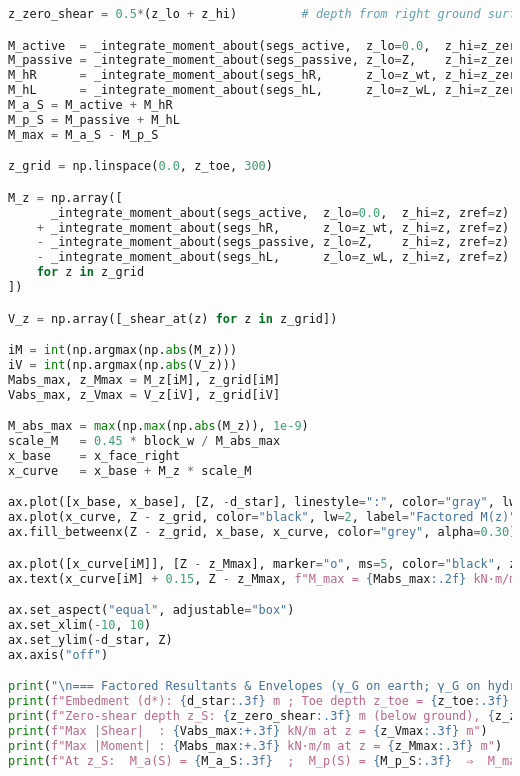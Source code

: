 \begin{lstlisting}[language=Python]
z_zero_shear = 0.5*(z_lo + z_hi)         # depth from right ground surface

M_active  = _integrate_moment_about(segs_active,  z_lo=0.0,  z_hi=z_zero_shear, zref=z_zero_shear)
M_passive = _integrate_moment_about(segs_passive, z_lo=Z,    z_hi=z_zero_shear, zref=z_zero_shear)
M_hR      = _integrate_moment_about(segs_hR,      z_lo=z_wt, z_hi=z_zero_shear, zref=z_zero_shear)
M_hL      = _integrate_moment_about(segs_hL,      z_lo=z_wL, z_hi=z_zero_shear, zref=z_zero_shear)
M_a_S = M_active + M_hR
M_p_S = M_passive + M_hL
M_max = M_a_S - M_p_S

z_grid = np.linspace(0.0, z_toe, 300)

M_z = np.array([
      _integrate_moment_about(segs_active,  z_lo=0.0,  z_hi=z, zref=z)
    + _integrate_moment_about(segs_hR,      z_lo=z_wt, z_hi=z, zref=z)
    - _integrate_moment_about(segs_passive, z_lo=Z,    z_hi=z, zref=z)
    - _integrate_moment_about(segs_hL,      z_lo=z_wL, z_hi=z, zref=z)
    for z in z_grid
])

V_z = np.array([_shear_at(z) for z in z_grid])

iM = int(np.argmax(np.abs(M_z)))
iV = int(np.argmax(np.abs(V_z)))
Mabs_max, z_Mmax = M_z[iM], z_grid[iM]
Vabs_max, z_Vmax = V_z[iV], z_grid[iV]

M_abs_max = max(np.max(np.abs(M_z)), 1e-9)
scale_M   = 0.45 * block_w / M_abs_max
x_base    = x_face_right
x_curve   = x_base + M_z * scale_M

ax.plot([x_base, x_base], [Z, -d_star], linestyle=":", color="gray", lw=1)
ax.plot(x_curve, Z - z_grid, color="black", lw=2, label="Factored M(z)")
ax.fill_betweenx(Z - z_grid, x_base, x_curve, color="grey", alpha=0.30)

ax.plot([x_curve[iM]], [Z - z_Mmax], marker="o", ms=5, color="black", zorder=25)
ax.text(x_curve[iM] + 0.15, Z - z_Mmax, f"M_max = {Mabs_max:.2f} kN·m/m", fontsize=8, ha="left", va="center")

ax.set_aspect("equal", adjustable="box")
ax.set_xlim(-10, 10)
ax.set_ylim(-d_star, Z)
ax.axis("off")

print("\n=== Factored Resultants & Envelopes (γ_G on earth; γ_G on hydro) ===")
print(f"Embedment (d*): {d_star:.3f} m ; Toe depth z_toe = {z_toe:.3f} m")
print(f"Zero-shear depth z_S: {z_zero_shear:.3f} m (below ground), {z_zero_shear - Z:.3f} m below dredge")
print(f"Max |Shear|  : {Vabs_max:+.3f} kN/m at z = {z_Vmax:.3f} m")
print(f"Max |Moment| : {Mabs_max:+.3f} kN·m/m at z = {z_Mmax:.3f} m")
print(f"At z_S:  M_a(S) = {M_a_S:.3f}  ;  M_p(S) = {M_p_S:.3f}  ⇒  M_max = {M_max:.3f} kN·m/m")


\end{lstlisting}
